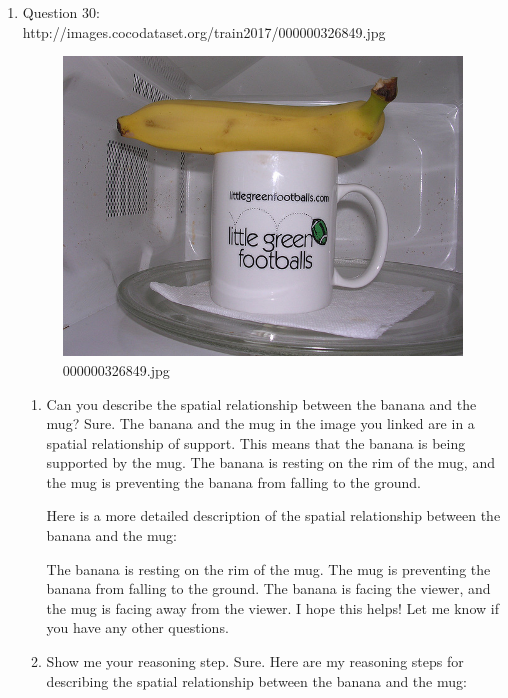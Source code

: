 \begin{enumerate}
\begin{enumerate}
        I hope this explanation is helpful! Let me know if you have any other questions.
    \end{enumerate}
    \item Question 30:\\http://images.cocodataset.org/train2017/000000326849.jpg
    \begin{figure}[h]
        \centering
        \includegraphics[width=0.8\linewidth]{../image set/easy/000000326849.jpg}
        \caption{000000326849.jpg}
    \end{figure}
    \begin{enumerate}
        \item Can you describe the spatial relationship between the banana and the mug?
        \subitem 
        Sure. The banana and the mug in the image you linked are in a spatial relationship of support. This means that the banana is being supported by the mug. The banana is resting on the rim of the mug, and the mug is preventing the banana from falling to the ground.
        
        Here is a more detailed description of the spatial relationship between the banana and the mug:
        
        The banana is resting on the rim of the mug.
        The mug is preventing the banana from falling to the ground.
        The banana is facing the viewer, and the mug is facing away from the viewer.
        I hope this helps! Let me know if you have any other questions.
        \item Show me your reasoning step.
        \subitem 
        Sure. Here are my reasoning steps for describing the spatial relationship between the banana and the mug:
        

\end{enumerate}
\end{enumerate}
